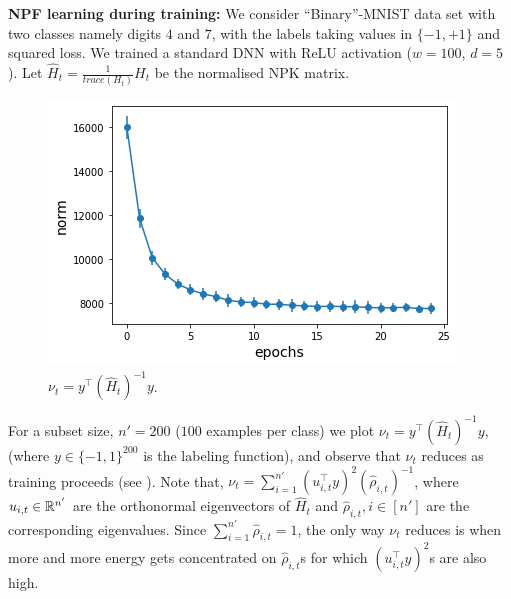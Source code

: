 \textbf{NPF learning during training:} We consider ``Binary''-MNIST data set with two classes namely digits $4$ and $7$, with the labels taking values in $\{-1,+1\}$ and squared loss. We trained a standard DNN with ReLU activation ($w=100$, $d=5$). Let $\widehat{H}_t=\frac{1}{trace(H_t)}H_t$ be the normalised NPK matrix. 
\begin{figure}
\includegraphics[scale=0.25]{figs/path-gram.png}
\caption{\label{fig:gen}$\nu_t=y^\top (\widehat{H}_t)^{-1} y$.}
\end{figure}
For a subset size, $n'=200$ ($100$ examples per class) we plot $\nu_t=y^\top (\widehat{H}_t)^{-1} y$, (where $y\in\{-1,1\}^{200}$ is the labeling function), and observe that $\nu_t$ reduces as training proceeds (see ). Note that, $\nu_t=\sum_{i=1}^{n'}(u_{i,t}^\top y)^2 (\hat{\rho}_{i,t})^{-1}$, where $u_{i,t}\in \mathbb{R}^{n'}$ are the orthonormal eigenvectors of $\widehat{H}_t$ and $\hat{\rho}_{i,t},i\in[n']$ are the corresponding eigenvalues. Since $\sum_{i=1}^{n'}\hat{\rho}_{i,t}=1$, the only way $\nu_t$ reduces is when more and more energy gets concentrated on $\hat{\rho}_{i,t}$s for which $(u_{i,t}^\top y)^2$s are also high.\WFclear%


